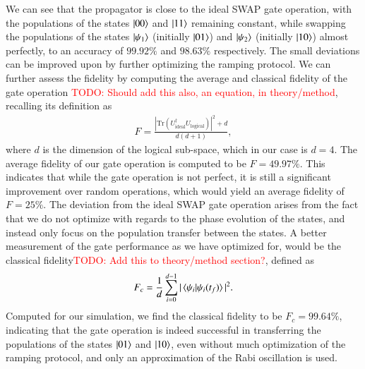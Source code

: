 \documentclass{subfiles}
\begin{document}
We can see that the propagator is close to the ideal SWAP gate operation, with the populations of the states $\ket{00}$ and $\ket{11}$ remaining constant, while swapping the populations of the states $\ket{\psi_1}$  (initially $\ket{01}$) and $\ket{\psi_2}$ (initially $\ket{10}$) almost perfectly, to an accuracy of $99.92\%$ and $98.63\%$ respectively. The small deviations can be improved upon by further optimizing the ramping protocol. We can further assess the fidelity by computing the average and classical fidelity of the gate operation \textcolor{red}{TODO: Should add this also, an equation, in theory/method}, recalling its definition as
\begin{align*}
    F = \frac{|\text{Tr}(U_{\text{ideal}}^\dagger U_{\text{logical}})|^2 + d}{d(d+1)},
\end{align*}
where $d$ is the dimension of the logical sub-space, which in our case is $d=4$. The average fidelity of our gate operation is computed to be $F = 49.97\%$. This indicates that while the gate operation is not perfect, it is still a significant improvement over random operations, which would yield an average fidelity of $F = 25\%$. The deviation from the ideal SWAP gate operation arises from the fact that we do not optimize with regards to the phase evolution of the states, and instead only focus on the population transfer between the states. A better measurement of the gate performance as we have optimized for, would be the classical fidelity\textcolor{red}{TODO: Add this to theory/method section?}, defined as
\begin{align*}
    F_c = \frac{1}{d} \sum_{i=0}^{d-1} |\braket{\psi_i | \psi_i(t_f)}|^2.
\end{align*}
Computed for our simulation, we find the classical fidelity to be $F_c = 99.64\%$, indicating that the gate operation is indeed successful in transferring the populations of the states $\ket{01}$ and $\ket{10}$, even without much optimization of the ramping protocol, and only an approximation of the Rabi oscillation is used. 
\end{document}
